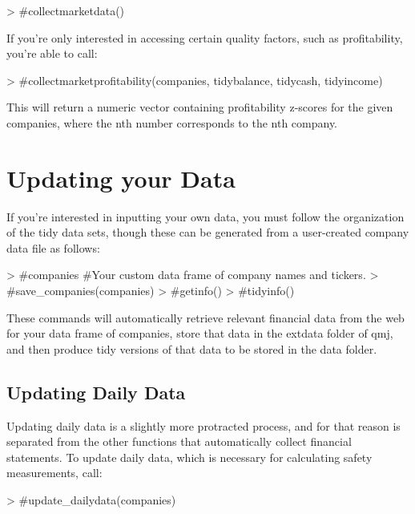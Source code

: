 \documentclass[12pt]{article}
\begin{document}
\begin{Schunk}
\begin{Sinput}
> #collectmarketdata()
\end{Sinput}
\end{Schunk}

If you're only interested in accessing certain quality factors, such as profitability, you're able to call:

\begin{Schunk}
\begin{Sinput}
> #collectmarketprofitability(companies, tidybalance, tidycash, tidyincome)
\end{Sinput}
\end{Schunk}

This will return a numeric vector containing profitability z-scores for the given companies, where the nth number corresponds to the nth company. 

\section*{Updating your Data}
If you're interested in inputting your own data, you must follow the organization of the tidy data sets, though these can be generated from a user-created company data file as follows:

\begin{Schunk}
\begin{Sinput}
> #companies #Your custom data frame of company names and tickers.
> #save_companies(companies)
> #getinfo()
> #tidyinfo()
\end{Sinput}
\end{Schunk}

These commands will automatically retrieve relevant financial data from the web for your data frame of companies, store that data in the extdata folder of qmj, and then produce tidy versions of that data to be stored in the data folder.

\subsection*{Updating Daily Data}
Updating daily data is a slightly more protracted process, and for that reason is separated from the other functions that automatically collect financial statements. To update daily data, which is necessary for calculating safety measurements, call:

\begin{Schunk}
\begin{Sinput}
> #update_dailydata(companies)
\end{Sinput}
\end{Schunk}
\end{document}
